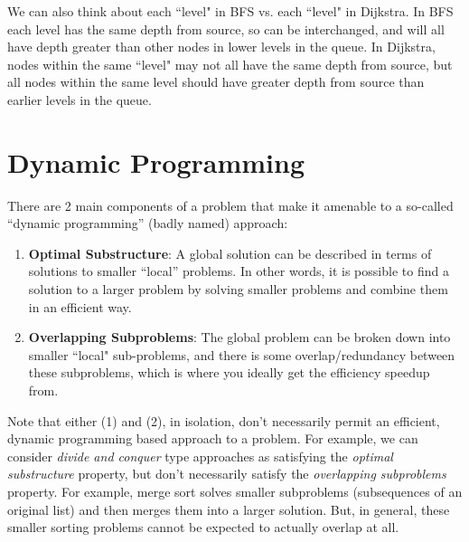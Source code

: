 \documentclass[10pt,a4paper]{article}
\begin{document}
We can also think about each ``level" in BFS vs. each ``level" in Dijkstra. In BFS each level has the same depth from source, so can be interchanged, and will all have depth greater than other nodes in lower levels in the queue. In Dijkstra, nodes within the same ``level" may not all have the same depth from source, but all nodes within the same level should have greater depth from source than earlier levels in the queue.

\section{Dynamic Programming}

There are 2 main components of a problem that make it amenable to a so-called ``dynamic programming'' (badly named) approach:
\begin{enumerate}
    \item \textbf{Optimal Substructure}: A global solution can be described in terms of solutions to smaller ``local'' problems. In other words, it is possible to find a solution to a larger problem by solving smaller problems and combine them in an efficient way. 
    \item \textbf{Overlapping Subproblems}: The global problem can be broken down into smaller ``local" sub-problems, and there is some overlap/redundancy between these subproblems, which is where you ideally get the efficiency speedup from.
\end{enumerate}
Note that either (1) and (2), in isolation, don't necessarily permit an efficient, dynamic programming based approach to a problem. For example, we can consider \textit{divide and conquer} type approaches as satisfying the \textit{optimal substructure} property, but don't necessarily satisfy the \textit{overlapping subproblems} property. For example, merge sort solves smaller subproblems (subsequences of an original list) and then merges them into a larger solution. But, in general, these smaller sorting problems cannot be expected to actually overlap at all.
\end{document}
